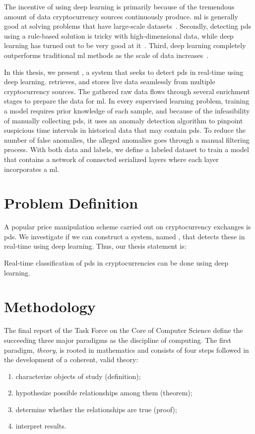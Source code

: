 The incentive of using deep learning is primarily because of the tremendous amount of data cryptocurrency sources continuously produce. \ac{ml} is generally good at solving problems that have large-scale datasets~\cite{aws}. Secondly, detecting \acp{pd} using a rule-based solution is tricky with high-dimensional data, while deep learning has turned out to be very good at it~\cite{lecun2015deep}. Third, deep learning completely outperforms traditional \ac{ml} methods as the scale of data increases~\cite{dl_intrusion, peng2015multi}. 

In this thesis, we present \project, a system that seeks to detect \acp{pd} in real-time using deep learning. \project retrieves, and stores live data seamlessly from multiple cryptocurrency sources. The gathered raw data flows through several enrichment stages to prepare the data for \ac{ml}. In every supervised learning problem, training a model requires prior knowledge of each sample, and because of the infeasibility of manually collecting \acp{pd}, it uses an anomaly detection algorithm to pinpoint suspicious time intervals in historical data that may contain \acp{pd}. To reduce the number of false anomalies, the alleged anomalies goes through a manual filtering process. With both data and labels, we define a labeled dataset to train a model that contains a network of connected serialized layers where each layer incorporates a \ac{ml}.

\section{Problem Definition}\label{sec:problem_definition}
A popular price manipulation scheme carried out on cryptocurrency exchanges is \acp{pd}. We investigate if we can construct a system, named \project, that detects these in real-time using deep learning. Thus, our thesis statement is:

\begin{displayquote}
    \begin{em}
    Real-time classification of \acfp{pd} in cryptocurrencies can be done using deep learning.
    \end{em}
\end{displayquote}


\section{Methodology}\label{sec:methodology}
The final report of the Task Force on the Core of Computer Science\cite{computing_as_a_discipline} define the succeeding three major paradigms as the discipline of computing. The first paradigm, \emph{theory}, is rooted in mathematics and consists of four steps followed in the development of a coherent, valid theory: 
\begin{enumerate}
    \item characterize objects of study (definition);
    \item hypothesize possible relationships among them (theorem);
    \item determine whether the relationships are true (proof); 
    \item interpret results.
\end{enumerate}

